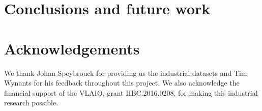 \documentclass[preprint,12pt]{elsarticle}
\begin{document}
\section{Conclusions and future work}

\section*{Acknowledgements}

We thank Johan Speybrouck for providing us the industrial datasets and Tim Wynants for his feedback throughout this project. We also acknowledge the financial support of the VLAIO, grant HBC.2016.0208, for making this industrial research possible.





%





%
%
%
\end{document}
